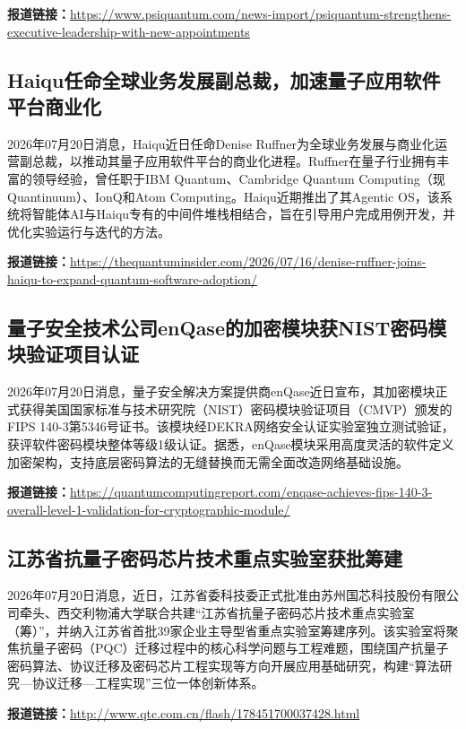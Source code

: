 \documentclass[12pt,a4paper]{ctexart}
\begin{document}
\noindent\textbf{报道链接：}\url{https://www.psiquantum.com/news-import/psiquantum-strengthens-executive-leadership-with-new-appointments}

\subsection{ Haiqu任命全球业务发展副总裁，加速量子应用软件平台商业化 }

2026年07月20日消息，Haiqu近日任命Denise Ruffner为全球业务发展与商业化运营副总裁，以推动其量子应用软件平台的商业化进程。Ruffner在量子行业拥有丰富的领导经验，曾任职于IBM Quantum、Cambridge Quantum Computing（现Quantinuum）、IonQ和Atom Computing。Haiqu近期推出了其Agentic OS，该系统将智能体AI与Haiqu专有的中间件堆栈相结合，旨在引导用户完成用例开发，并优化实验运行与迭代的方法。

\noindent\textbf{报道链接：}\url{https://thequantuminsider.com/2026/07/16/denise-ruffner-joins-haiqu-to-expand-quantum-software-adoption/}

\subsection{ 量子安全技术公司enQase的加密模块获NIST密码模块验证项目认证 }

2026年07月20日消息，量子安全解决方案提供商enQase近日宣布，其加密模块正式获得美国国家标准与技术研究院（NIST）密码模块验证项目（CMVP）颁发的FIPS 140-3第5346号证书。该模块经DEKRA网络安全认证实验室独立测试验证，获评软件密码模块整体等级1级认证。据悉，enQase模块采用高度灵活的软件定义加密架构，支持底层密码算法的无缝替换而无需全面改造网络基础设施。

\noindent\textbf{报道链接：}\url{https://quantumcomputingreport.com/enqase-achieves-fips-140-3-overall-level-1-validation-for-cryptographic-module/}

\subsection{ 江苏省抗量子密码芯片技术重点实验室获批筹建 }

2026年07月20日消息，近日，江苏省委科技委正式批准由苏州国芯科技股份有限公司牵头、西交利物浦大学联合共建“江苏省抗量子密码芯片技术重点实验室（筹）”，并纳入江苏省首批39家企业主导型省重点实验室筹建序列。该实验室将聚焦抗量子密码（PQC）迁移过程中的核心科学问题与工程难题，围绕国产抗量子密码算法、协议迁移及密码芯片工程实现等方向开展应用基础研究，构建“算法研究—协议迁移—工程实现”三位一体创新体系。

\noindent\textbf{报道链接：}\url{http://www.qtc.com.cn/flash/178451700037428.html}
\end{document}
